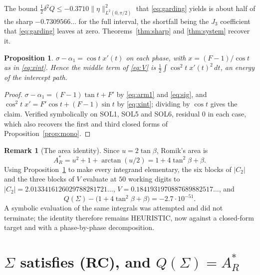 \documentclass[11pt]{article}
\newtheorem{proposition}[theorem]{Proposition}
\theoremstyle{definition}
\newtheorem{remark}[theorem]{Remark}
\newcommand{\Sig}{\Sigma}
\begin{document}
The bound $\tfrac12\delta^2Q\le-0.3710\|\eta\|_{L^2(0,\pi/2)}^2$ that \eqref{eq:garding}
yields is about half of the sharp $-0.7309566\ldots$ for the full interval, the
shortfall being the $J_3$ coefficient that \eqref{eq:garding} leaves at zero.
Theorems~\ref{thm:sharp} and \ref{thm:system} recover it.

\begin{proposition}\label{prop:sigx}
$\sigma-\alpha_1=\cos t\;x'(t)$ on each phase, with $x=(F-1)/\cos t$ as in
\eqref{eq:xint}. Hence the middle term of \eqref{eq:V} is
$\tfrac12\int\cos^2t\;x'(t)^2\,dt$, an energy of the intercept path.
\end{proposition}

\begin{proof}
$\sigma-\alpha_1=(F-1)\tan t+F'$ by \eqref{eq:arm1} and \eqref{eq:sig}, and
$\cos^2t\;x'=F'\cos t+(F-1)\sin t$ by \eqref{eq:xint}; dividing by $\cos t$ gives the
claim. Verified symbolically on SOL1, SOL5 and SOL6, residual $0$ in each case, which
also recovers the first and third closed forms of Proposition~\ref{prop:mono}.
\end{proof}

\begin{remark}[The area identity]\label{rem:area}
Since $u=2\tan\beta$, Romik's area is
\[
  A_R^\ast=u^2+1+\arctan(u/2)=1+4\tan^2\beta+\beta .
\]
Using Proposition~\ref{prop:sigx} to make every integrand elementary, the six blocks of
$|C_2|$ and the three blocks of $V$ evaluate at $50$ working digits to
$|C_2|=2.0133416126029788281721\ldots$, $V=0.1841931970887689882517\ldots$, and
\[
  Q(\Sig)-\bigl(1+4\tan^2\beta+\beta\bigr)=-2.7\cdot10^{-51}.
\]
A symbolic evaluation of the same integrals was attempted and did not terminate; the
identity therefore remains HEURISTIC, now against a closed-form target and with a
phase-by-phase decomposition.
\end{remark}

\section{\texorpdfstring{$\Sig$}{Sigma} satisfies (RC), and \texorpdfstring{$Q(\Sig)=A_R^\ast$}{Q = A_R}}
\label{sec:rcsigma}
\end{document}
